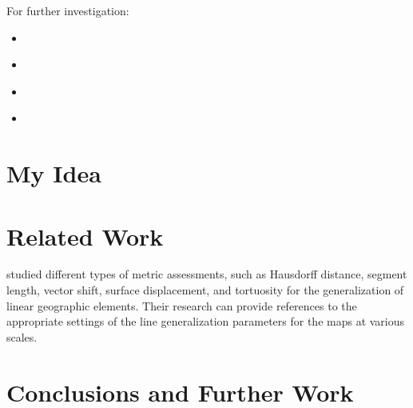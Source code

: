 \documentclass{article}
\begin{document}
For further investigation:
\begin{itemize}
    \item \cite{jiang2003line}
    \item \cite{dyken2009simultaneous}
    \item \cite{mustafa2006dynamic}
    \item \cite{nollenburg2008morphing}
\end{itemize}

\section{My Idea}
\label{sec:my_idea}

\section{Related Work}
\label{sec:related_work}

\cite{stanislawski2012automated} studied different types of metric assessments,
such as Hausdorff distance, segment length, vector shift, surface displacement,
and tortuosity for the generalization of linear geographic elements. Their
research can provide references to the appropriate settings of the line
generalization parameters for the maps at various scales.


\section{Conclusions and Further Work}
\label{sec:conclusions_and_further_work}

\printbibliography
\end{document}
